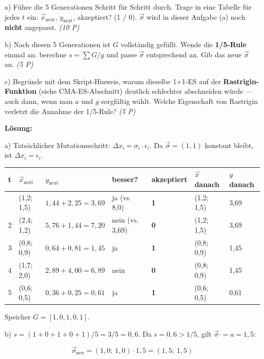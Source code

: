 \documentclass[11pt, a4paper]{article}
\begin{document}
a) Führe die 5 Generationen Schritt für Schritt durch. Trage in eine Tabelle für jedes $t$ ein: $\vec x_{\text{next}}$, $y_{\text{next}}$, akzeptiert? (1 / 0). $\vec\sigma$ wird in dieser Aufgabe (a) noch \textbf{nicht} angepasst. \textit{(10 P)}


b) Nach diesen 5 Generationen ist $G$ vollständig gefüllt. Wende die \textbf{1/5-Rule} einmal an: berechne $s = \sum G / g$ und passe $\vec\sigma$ entsprechend an. Gib das neue $\vec\sigma$ an. \textit{(5 P)}


c) Begründe mit dem Skript-Hinweis, warum dieselbe 1+1-ES auf der \textbf{Rastrigin-Funktion} (siehe CMA-ES-Abschnitt) deutlich schlechter abschneiden würde — auch dann, wenn man $a$ und $g$ sorgfältig wählt. Welche Eigenschaft von Rastrigin verletzt die Annahme der 1/5-Rule? \textit{(5 P)}


\textbf{Lösung:}


a) Tatsächlicher Mutationsschritt: $\Delta x_i = \sigma_i \cdot \epsilon_i$. Da $\vec\sigma=(1,1)$ konstant bleibt, ist $\Delta x_i = \epsilon_i$.



{\footnotesize
\begin{tabularx}{\linewidth}{XXXXXXX}
\hline
\rowcolor{tableheadbg}
{\color{white}\textbf{t}} & {\color{white}\textbf{$\vec x_{\text{next}}$}} & {\color{white}\textbf{$y_{\text{next}}$}} & {\color{white}\textbf{besser?}} & {\color{white}\textbf{akzeptiert}} & {\color{white}\textbf{$\vec x$ danach}} & {\color{white}\textbf{$y$ danach}} \\[2pt]
\hline
\endhead
\hline
\endfoot
1 & (1,2; 1,5) & $1{,}44+2{,}25 = 3{,}69$ & ja (vs. 8,0) & \textbf{1} & (1,2; 1,5) & 3,69 \\
2 & (2,4; 1,2) & $5{,}76+1{,}44 = 7{,}20$ & nein (vs. 3,69) & \textbf{0} & (1,2; 1,5) & 3,69 \\
3 & (0,8; 0,9) & $0{,}64+0{,}81 = 1{,}45$ & ja & \textbf{1} & (0,8; 0,9) & 1,45 \\
4 & (1,7; 2,0) & $2{,}89+4{,}00 = 6{,}89$ & nein & \textbf{0} & (0,8; 0,9) & 1,45 \\
5 & (0,6; 0,5) & $0{,}36+0{,}25 = 0{,}61$ & ja & \textbf{1} & (0,6; 0,5) & 0,61 \\
\end{tabularx}
}


Speicher $G = [1, 0, 1, 0, 1]$.


b) $s = (1+0+1+0+1)/5 = 3/5 = 0{,}6$. Da $s = 0{,}6 > 1/5$, gilt $\vec\sigma \mathrel{\cdot{=}} a = 1{,}5$:

\[
\vec\sigma_{\text{neu}} = (1{,}0;\ 1{,}0)\cdot 1{,}5 = (1{,}5;\ 1{,}5)
\]
\end{document}
